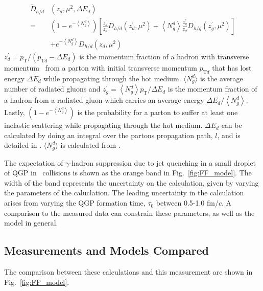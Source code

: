 \begin{equation}
  \begin{aligned}
    \tilde{D}_{h / d} &\left(z_{d}, \mu^{2}, \Delta E_{d}\right) \\
    =&\left(1-e^{-\left\langle N_{g}^{d}\right\rangle}\right)\left[\frac{z_{d}^{\prime}}{z_{d}} D_{h / d}\left(z_{d}^{\prime}, \mu^{2}\right)+\left\langle N_{g}^{d}\right\rangle \frac{z_{g}^{\prime}}{z_{d}} D_{h / g}\left(z_{g}^{\prime}, \mu^{2}\right)\right] \\
     &+e^{-\left\langle N_{g}^{d}\right\rangle} D_{h / d}\left(z_{d}, \mu^{2}\right)
  \end{aligned}
\end{equation}
$z_{d}^{\prime}=p_{\mathrm{T}} /\left(p_{\mathrm{T} d}-\Delta E_{d}\right)$ is the momentum fraction of a hadron with transverse momentum \pt~from a parton with initial transverse momentum $p_{\mathrm{T}d}$ that has lost energy $\Delta E_d$ while propagating through the hot medium.  $\langle N_g^d \rangle$ is the average number of radiated gluons and $z_{g}^{\prime}=\left\langle N_{g}^{d}\right\rangle p_{\mathrm{T}} / \Delta E_{d}$ is the momentum fraction of a hadron from a radiated gluon which carries an average energy $\Delta E_{d} /\left\langle N_{g}^{d}\right\rangle$. Lastly, $\left(1-e^{-\left\langle N_{g}^{d}\right\rangle}\right)$ is the probability for a parton to suffer at least one inelastic scattering while propagating through the hot medium. $\Delta E_{d}$ can be calculated by doing an integral over the partons propagation path, $l$, and is detailed in \cite{Wang2002}. $\langle N_g^d \rangle$ is calculated from \cite{Chang2014}.

The expectation of $\gamma$-hadron suppression due to jet quenching in a small droplet of QGP in \pPb~collisions is shown as the orange band in Fig.~\ref{fig:FF_model}. The width of the band represents the uncertainty on the calculation, given by varying the parameters of the caluclation. The leading uncertainty in the calculation arises from varying the QGP formation time, $\tau_0$ between 0.5-1.0 fm/$c$. A comparison to the measured data can constrain these parameters, as well as the model in general.

\subsection{Measurements and Models Compared}
\label{sec:comparison}

The comparison between these calculations and this measurement are shown in Fig.~\ref{fig:FF_model}.

